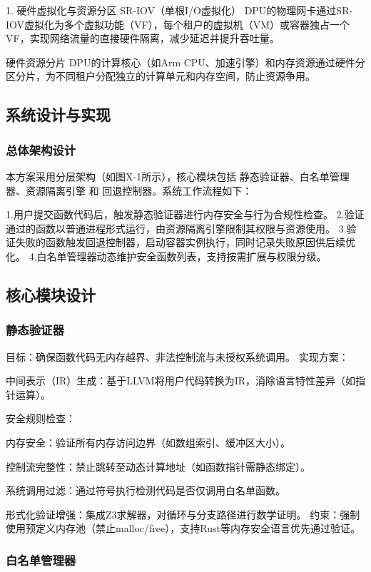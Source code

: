 1. 硬件虚拟化与资源分区
SR-IOV（单根I/O虚拟化）
DPU的物理网卡通过SR-IOV虚拟化为多个虚拟功能（VF），每个租户的虚拟机（VM）或容器独占一个VF，实现网络流量的直接硬件隔离，减少延迟并提升吞吐量。

硬件资源分片
DPU的计算核心（如Arm CPU、加速引擎）和内存资源通过硬件分区分片，为不同租户分配独立的计算单元和内存空间，防止资源争用。 

\subsection{系统设计与实现}

\subsubsection{总体架构设计}

本方案采用分层架构（如图X-1所示），核心模块包括 静态验证器、白名单管理器、资源隔离引擎 和 回退控制器。系统工作流程如下：

1.用户提交函数代码后，触发静态验证器进行内存安全与行为合规性检查。
2.验证通过的函数以普通进程形式运行，由资源隔离引擎限制其权限与资源使用。
3.验证失败的函数触发回退控制器，启动容器实例执行，同时记录失败原因供后续优化。
4.白名单管理器动态维护安全函数列表，支持按需扩展与权限分级。


\subsection{ 核心模块设计}

\subsubsection{静态验证器}

目标：确保函数代码无内存越界、非法控制流与未授权系统调用。
实现方案：

中间表示（IR）生成：基于LLVM将用户代码转换为IR，消除语言特性差异（如指针运算）。

安全规则检查：

内存安全：验证所有内存访问边界（如数组索引、缓冲区大小）。

控制流完整性：禁止跳转至动态计算地址（如函数指针需静态绑定）。

系统调用过滤：通过符号执行检测代码是否仅调用白名单函数。

形式化验证增强：集成Z3求解器，对循环与分支路径进行数学证明。
约束：强制使用预定义内存池（禁止malloc/free），支持Rust等内存安全语言优先通过验证。

\subsubsection{白名单管理器}

